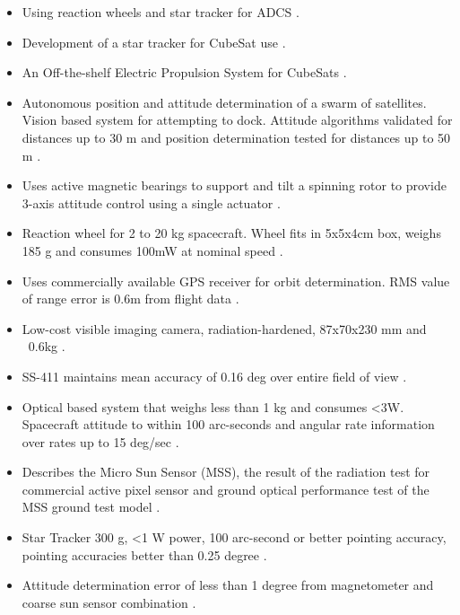 \begin{itemize}
\item Using reaction wheels and star tracker for ADCS \cite{Lemke}.

\item Development of a star tracker for CubeSat use \cite{Segert}.

\item An Off-the-shelf Electric Propulsion System for CubeSats \cite{Clark}.

\item Autonomous position and attitude determination of a swarm of satellites. Vision based system for attempting to dock. Attitude algorithms validated for distances up to 30 m and position determination tested for distances up to 50 m \cite{Smail}.

\item Uses active magnetic bearings to support and tilt a spinning rotor to provide 3-axis attitude control using a single actuator \cite{Seddon}.

\item Reaction wheel for 2 to 20 kg spacecraft. Wheel fits in 5x5x4cm box, weighs 185 g and consumes 100mW at nominal speed \cite{Sinclair2}.

\item Uses commercially available GPS receiver for orbit determination. RMS value of range error is 0.6m from flight data \cite{Saito}.

\item Low-cost visible imaging camera, radiation-hardened, 87x70x230 mm and ~0.6kg \cite{Shumway}.

\item SS-411 maintains mean accuracy of 0.16 deg over entire field of view \cite{Enright2}.

\item Optical based system that weighs less than 1 kg and consumes <3W. Spacecraft attitude to within 100 arc-seconds and angular rate information over rates up to 15 deg/sec \cite{Seng}.

\item Describes the Micro Sun Sensor (MSS), the result of the radiation test for commercial active pixel sensor and ground optical performance test of the MSS ground test model \cite{Yoshihara}.

\item Star Tracker 300 g, <1 W power, 100 arc-second or better pointing accuracy, pointing accuracies better than 0.25 degree \cite{Zenick}.

\item Attitude determination error of less than 1 degree from magnetometer and coarse sun sensor combination \cite{Theil}.
\end{itemize}

%